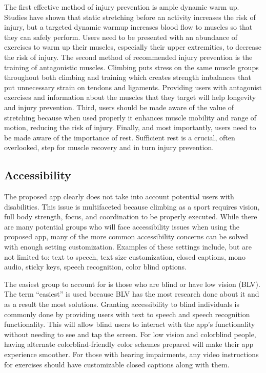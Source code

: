 \documentclass[10pt,twocolumn]{article}
\begin{document}
    The first effective method of injury prevention is ample dynamic warm up. Studies have shown that static stretching before an activity increases the risk of injury, but a targeted dynamic warmup increases blood flow to muscles so that they can safely perform. \cite{ellis_top_nodate} Users need to be presented with an abundance of exercises to warm up their muscles, especially their upper extremities, to decrease the risk of injury. The second method of recommended injury prevention is the training of antagonistic muscles. Climbing puts stress on the same muscle groups throughout both climbing and training which creates strength imbalances that put unnecessary strain on tendons and ligaments. Providing users with antagonist exercises and information about the muscles that they target will help longevity and injury prevention. \cite{meyers_rock_nodate} Third, users should be made aware of the value of stretching because when used properly it enhances muscle mobility and range of motion, reducing the risk of injury. \cite{ellis_top_nodate} Finally, and most importantly, users need to be made aware of the importance of rest. Sufficient rest is a crucial, often overlooked, step for muscle recovery and in turn injury prevention. 

\subsection{Accessibility}
    
    The proposed app clearly does not take into account potential users with disabilities. This issue is multifaceted because climbing as a sport requires vision, full body strength, focus, and coordination to be properly executed. While there are many potential groups who will face accessibility issues when using the proposed app, many of the more common accessibility concerns can be solved with enough setting customization. Examples of these settings include, but are not limited to: text to speech, text size customization, closed captions, mono audio, sticky keys, speech recognition, color blind options. \cite{gcf_computer_nodate}

    The easiest group to account for is those who are blind or have low vision (BLV). The term “easiest” is used because BLV has the most research done about it and as a result the most solutions. \cite{mack_what_2021} Granting accessibility to blind individuals is commonly done by providing users with text to speech and speech recognition functionality. This will allow blind users to interact with the app’s functionality without needing to see and tap the screen. For low vision and colorblind people, having alternate colorblind-friendly color schemes prepared will make their app experience smoother. For those with hearing impairments, any video instructions for exercises should have customizable closed captions along with them.
\end{document}
